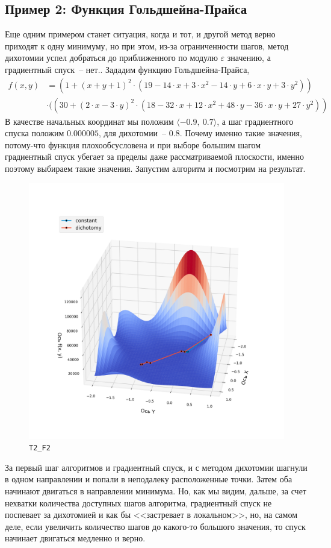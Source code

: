 \documentclass[12pt, a4paper, oneside, final]{article}
\begin{document}
	\subsection*{Пример 2: Функция Гольдшейна-Прайса}
	Еще одним примером станет ситуация, когда и тот, и другой метод верно приходят к одну минимуму, но при этом, из-за ограниченности шагов, метод дихотомии успел добраться до приближенного по модулю $\varepsilon$ значению, а градиентный спуск~-- нет.. Зададим функцию Гольдшейна-Прайса,
	\begin{align*}
		f(x, y) &= (1 + (x + y + 1)^2 \cdot (19 - 14 \cdot x + 3 \cdot x^2-14 \cdot y + 6 \cdot x \cdot y + 3 \cdot y^2)) \\
		&\cdot ((30 + (2 \cdot x - 3 \cdot y)^2 \cdot (18 - 32 \cdot x + 12 \cdot x^2 + 48 \cdot y - 36 \cdot x \cdot y+27 \cdot y^2))
	\end{align*}
	В качестве начальных координат мы положим $\langle -0.9, ~ 0.7\rangle$, а шаг градиентного спуска положим $0.000005$, для дихотомии~-- $0.8$. Почему именно такие значения, потому-что функция плохообсусловена и при выборе большим шагом градиентный спуск убегает за пределы даже рассматриваемой плоскости, именно поэтому выбираем такие значения. Запустим алгоритм и посмотрим на результат.
	\begin{figure}[H]
		\centering
		\includegraphics[scale=0.68]{Image/T2_F2.png}
		\caption*{\texttt{T2\_F2}}
	\end{figure}
	За первый шаг алгоритмов и градиентный спуск, и с методом дихотомии шагнули в одном направлении и попали в неподалеку расположенные точки. Затем оба начинают двигаться в направлении минимума. Но, как мы видим, дальше, за счет нехватки количества доступных шагов алгоритма, градиентный спуск не поспевает за дихотомией и как бы <<застревает в локальном>>, но, на самом деле, если увеличить количество шагов до какого-то большого значения, то спуск начинает двигаться медленно и верно.
	\newpage
\end{document}
